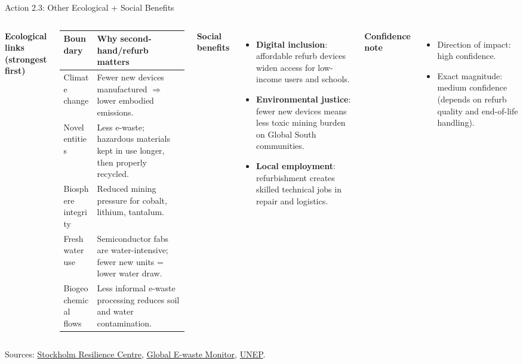 \documentclass[aspectratio=169]{beamer}
\begin{document}
\begin{frame}{Action 2.3: Other Ecological + Social Benefits}
\scriptsize
\begin{columns}[T,totalwidth=\textwidth]
\textbf{Ecological links (strongest first)}
\begin{tabular}{p{2.4cm}p{4.8cm}}
\toprule
Boundary & Why second-hand/refurb matters \\
\midrule
Climate change & Fewer new devices manufactured $\Rightarrow$ lower embodied emissions. \\
Novel entities & Less e-waste; hazardous materials kept in use longer, then properly recycled. \\
Biosphere integrity & Reduced mining pressure for cobalt, lithium, tantalum. \\
Freshwater use & Semiconductor fabs are water-intensive; fewer new units = lower water draw. \\
Biogeochemical flows & Less informal e-waste processing reduces soil and water contamination. \\
\bottomrule
\end{tabular}

\textbf{Social benefits}
\begin{itemize}
  \item \textbf{Digital inclusion}: affordable refurb devices widen access for low-income users and schools.
  \item \textbf{Environmental justice}: fewer new devices means less toxic mining burden on Global South communities.
  \item \textbf{Local employment}: refurbishment creates skilled technical jobs in repair and logistics.
\end{itemize}

\textbf{Confidence note}
\begin{itemize}
  \item Direction of impact: high confidence.
  \item Exact magnitude: medium confidence (depends on refurb quality and end-of-life handling).
\end{itemize}
\end{columns}
\vspace{0.08cm}
\tiny Sources: \href{https://www.stockholmresilience.org/research/planetary-boundaries.html}{Stockholm Resilience Centre}, \href{https://ewastemonitor.info/the-global-e-waste-monitor-2024/}{Global E-waste Monitor}, \href{https://www.unep.org}{UNEP}.
\end{frame}
\end{document}

